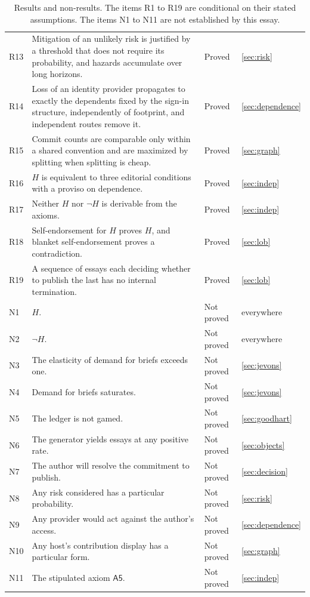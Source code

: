 \documentclass[11pt]{article}
\theoremstyle{plain}
\theoremstyle{definition}
\theoremstyle{remark}
\newcommand{\Hyp}{H}
\begin{document}
\begin{table}[ht]
\begin{tabular}{@{}p{}p{}p{}p{}@{}}
R13 & Mitigation of an unlikely risk is justified by a threshold that does not require its probability, and hazards accumulate over long horizons. & Proved & \ref{sec:risk} \\
R14 & Loss of an identity provider propagates to exactly the dependents fixed by the sign-in structure, independently of footprint, and independent routes remove it. & Proved & \ref{sec:dependence} \\
R15 & Commit counts are comparable only within a shared convention and are maximized by splitting when splitting is cheap. & Proved & \ref{sec:graph} \\
R16 & $\Hyp$ is equivalent to three editorial conditions with a proviso on dependence. & Proved & \ref{sec:indep} \\
R17 & Neither $\Hyp$ nor $\neg\Hyp$ is derivable from the axioms. & Proved & \ref{sec:indep} \\
R18 & Self-endorsement for $\Hyp$ proves $\Hyp$, and blanket self-endorsement proves a contradiction. & Proved & \ref{sec:lob} \\
R19 & A sequence of essays each deciding whether to publish the last has no internal termination. & Proved & \ref{sec:lob} \\
\midrule
N1 & $\Hyp$. & Not proved & everywhere \\
N2 & $\neg\Hyp$. & Not proved & everywhere \\
N3 & The elasticity of demand for briefs exceeds one. & Not proved & \ref{sec:jevons} \\
N4 & Demand for briefs saturates. & Not proved & \ref{sec:jevons} \\
N5 & The ledger is not gamed. & Not proved & \ref{sec:goodhart} \\
N6 & The generator yields essays at any positive rate. & Not proved & \ref{sec:objects} \\
N7 & The author will resolve the commitment to publish. & Not proved & \ref{sec:decision} \\
N8 & Any risk considered has a particular probability. & Not proved & \ref{sec:risk} \\
N9 & Any provider would act against the author's access. & Not proved & \ref{sec:dependence} \\
N10 & Any host's contribution display has a particular form. & Not proved & \ref{sec:graph} \\
N11 & The stipulated axiom $\mathsf{A5}$. & Not proved & \ref{sec:indep} \\
\bottomrule
\end{tabular}
\caption{Results and non-results. The items R1 to R19 are conditional on their stated assumptions. The items N1 to N11 are not established by this essay.}
\label{tab:results}
\end{table}
\end{document}

